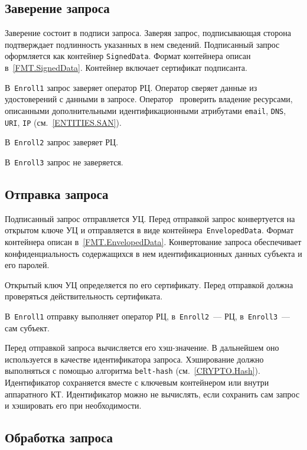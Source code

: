\subsection{Заверение запроса}\label{PROCESSES.Enroll.Signed}

Заверение состоит в подписи запроса. Заверяя запрос,
подписывающая сторона подтверждает подлинность указанных в нем сведений.
Подписанный запрос оформляется как контейнер \texttt{SignedData}.
Формат контейнера описан в~\ref{FMT.SignedData}. 
Контейнер включает сертификат подписанта.

В~\texttt{Enroll1} запрос заверяет оператор РЦ.
Оператор сверяет данные из удостоверений с данными в запросе.
%
Оператор~ проверить владение ресурсами, описанными
дополнительными идентификационными атрибутами \texttt{email}, \texttt{DNS},
\texttt{URI}, \texttt{IP} (см.~\ref{ENTITIES.SAN}).

В~\texttt{Enroll2} запрос заверяет РЦ.

В~\texttt{Enroll3} запрос не заверяется.

\subsection{Отправка запроса}\label{PROCESSES.Enroll.Enveloped}

Подписанный запрос отправляется УЦ. Перед отправкой запрос конвертуется на 
открытом ключе УЦ и отправляется в виде контейнера~\texttt{EnvelopedData}. 
Формат контейнера описан в~\ref{FMT.EnvelopedData}. 
Конвертование запроса обеспечивает конфиденциальность содержащихся в нем 
идентификационных данных субъекта и его паролей.  

Открытый ключ УЦ определяется по его сертификату. Перед отправкой 
должна проверяться действительность сертификата.

В~\texttt{Enroll1} отправку выполняет оператор РЦ,
в~\texttt{Enroll2}~--- РЦ,
в~\texttt{Enroll3}~--- сам субъект.

Перед отправкой запроса вычисляется его хэш-значение. 
В дальнейшем оно используется в качестве идентификатора запроса. 
Хэширование должно выполняться с помощью алгоритма 
\texttt{belt-hash} (см.~\ref{CRYPTO.Hash}).
%
Идентификатор сохраняется вместе с ключевым контейнером или внутри 
аппаратного КТ.
%
Идентификатор можно не вычислять, если сохранить сам запрос и хэшировать 
его при необходимости.

\subsection{Обработка запроса}\label{PROCESSES.Enroll.Issue}

